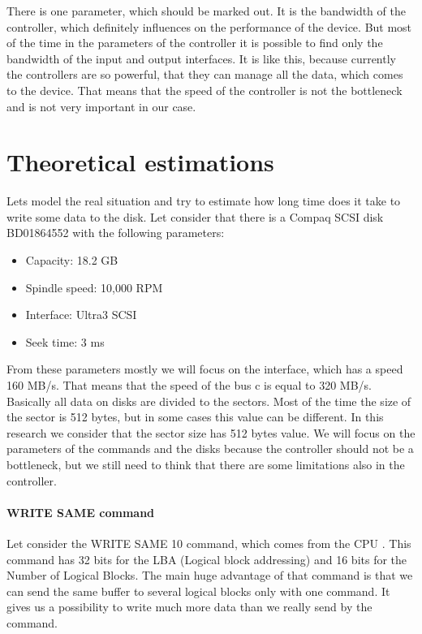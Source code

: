 There is one parameter, which should be marked out. It is the bandwidth of the controller, which definitely influences on the performance of the device. But most of the time in the parameters of the controller it is possible to find only the bandwidth of the input and output interfaces. It is like this, because currently the controllers are so powerful, that they can manage all the data, which comes to the device. That means that the speed of the controller is not the bottleneck and is not very important in our case.

\section{Theoretical estimations}
\label{sec:theory_est}

Lets model the real situation and try to estimate how long time does it take to write some data to the disk. Let consider that there is a Compaq SCSI disk BD01864552 with the following parameters: 
\begin{itemize}
	\setlength{\itemsep}{-2mm}
	\item Capacity: 18.2 GB
	\item Spindle speed: 10,000 RPM
	\item Interface: Ultra3 SCSI
	\item Seek time: 3 ms
\end{itemize}
From these parameters mostly we will focus on the interface, which has a speed 160 MB/s. That means that the speed of the bus c is equal to 320 MB/s. Basically all data on disks are divided to the sectors. Most of the time the size of the sector is 512 bytes, but in some cases this value can be different. In this research we consider that the sector size has 512 bytes value. We will focus on the parameters of the commands and the disks because the controller should not be a bottleneck, but we still need to think that there are some limitations also in the controller.

\paragraph{WRITE SAME command}
Let consider the WRITE SAME 10 command, which comes from the CPU \cite{scsi3_bc}. This command has 32 bits for the LBA (Logical block addressing) and 16 bits for the Number of Logical Blocks. The main huge advantage of that command is that we can send the same buffer to several logical blocks only with one command. It gives us a possibility to write much more data than we really send by the command.

